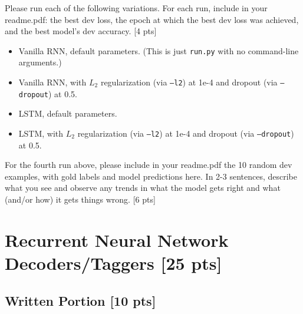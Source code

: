 \documentclass[11pt]{article}
\begin{document}
\noindent Please run each of the following variations.  For each run, include in your readme.pdf: the best dev loss, the epoch at which the best dev loss was achieved, and the best model's dev accuracy. \hfill [4 pts]
\begin{itemize}
  \item Vanilla RNN, default parameters.  (This is just \texttt{run.py} with no command-line arguments.)
  \item Vanilla RNN, with $L_2$ regularization (via \texttt{--l2}) at 1e-4 and dropout (via \texttt{--dropout}) at 0.5.
  \item LSTM, default parameters. 
  \item LSTM, with $L_2$ regularization (via \texttt{--l2}) at 1e-4 and dropout (via \texttt{--dropout}) at 0.5.
\end{itemize}

\vspace{2em}
 For the fourth run above, please include in your readme.pdf the 10 random dev examples, with gold labels and model predictions here.  In 2-3 sentences, describe what you see and observe any trends in what the model gets right and what (and/or how) it gets things wrong. \hfill [6 pts]


\section{Recurrent Neural Network Decoders/Taggers [25 pts]}

\subsection{Written Portion [10 pts]}
\end{document}
